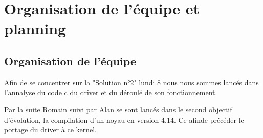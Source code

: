 
\chapter{Organisation de l'équipe et planning} %

\label{Chapter1} %


\section{Organisation de l'équipe}

Afin de se concentrer sur la "Solution n°2" lundi 8 nous nous sommes lancés dans
l'annalyse du code c du driver et du déroulé de son fonctionnement.

Par la suite Romain suivi par Alan se sont lancés dans le second objectif
d'évolution, la compilation d'un noyau en version 4.14. Ce afinde précéder le
portage du driver à ce kernel.

\begin{comment}
\section{Planning}

Nous vous avons ici présenté un planning des tâches effectuées durant ces 8 \\
derniers jours, les noms attribués à chaque tâche seront développés dans la suite du rapport.


Les trois solutions qui sont présentées ci-dessous correspondent à trois codes sources.

\end{comment}
